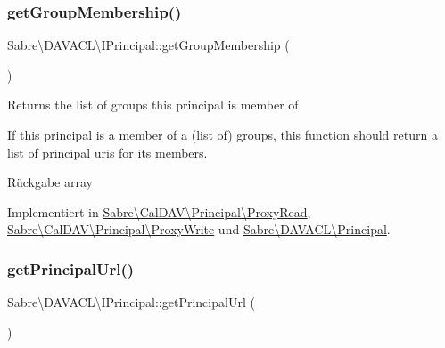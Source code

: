 \subsubsection{\texorpdfstring{get\+Group\+Membership()}{getGroupMembership()}}
{\footnotesize\ttfamily Sabre\textbackslash{}\+D\+A\+V\+A\+C\+L\textbackslash{}\+I\+Principal\+::get\+Group\+Membership (\begin{DoxyParamCaption}{ }\end{DoxyParamCaption})}

Returns the list of groups this principal is member of

If this principal is a member of a (list of) groups, this function should return a list of principal uri\textquotesingle{}s for it\textquotesingle{}s members.

\begin{DoxyReturn}{Rückgabe}
array 
\end{DoxyReturn}


Implementiert in \mbox{\hyperlink{class_sabre_1_1_cal_d_a_v_1_1_principal_1_1_proxy_read_a90cc837d2d8cdf82b369f25dc22e64c3}{Sabre\textbackslash{}\+Cal\+D\+A\+V\textbackslash{}\+Principal\textbackslash{}\+Proxy\+Read}}, \mbox{\hyperlink{class_sabre_1_1_cal_d_a_v_1_1_principal_1_1_proxy_write_af370032d4f7d8140d6ac341ccf429bec}{Sabre\textbackslash{}\+Cal\+D\+A\+V\textbackslash{}\+Principal\textbackslash{}\+Proxy\+Write}} und \mbox{\hyperlink{class_sabre_1_1_d_a_v_a_c_l_1_1_principal_a64163e10348143c641f84e3c13de35a6}{Sabre\textbackslash{}\+D\+A\+V\+A\+C\+L\textbackslash{}\+Principal}}.

\mbox{\label{interface_sabre_1_1_d_a_v_a_c_l_1_1_i_principal_ae3fc8f13f54eb5daba7416068c685298}} 
\subsubsection{\texorpdfstring{get\+Principal\+Url()}{getPrincipalUrl()}}
{\footnotesize\ttfamily Sabre\textbackslash{}\+D\+A\+V\+A\+C\+L\textbackslash{}\+I\+Principal\+::get\+Principal\+Url (\begin{DoxyParamCaption}{ }\end{DoxyParamCaption})}

